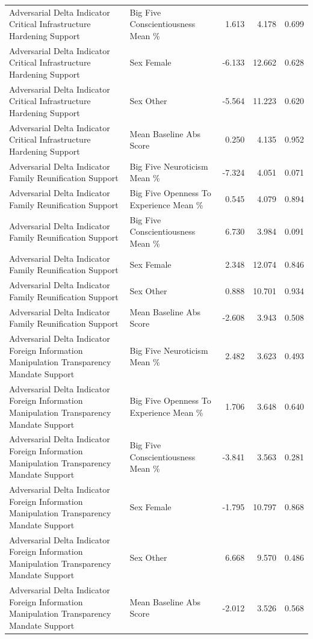 \begin{table}[htbp]
\begin{threeparttable}
\begin{tabular}{llrrr}
Adversarial Delta Indicator Critical Infrastructure Hardening Support & Big Five Conscientiousness Mean \% & 1.613 & 4.178 & 0.699 \\
Adversarial Delta Indicator Critical Infrastructure Hardening Support & Sex Female & -6.133 & 12.662 & 0.628 \\
Adversarial Delta Indicator Critical Infrastructure Hardening Support & Sex Other & -5.564 & 11.223 & 0.620 \\
Adversarial Delta Indicator Critical Infrastructure Hardening Support & Mean Baseline Abs Score & 0.250 & 4.135 & 0.952 \\
Adversarial Delta Indicator Family Reunification Support & Big Five Neuroticism Mean \% & -7.324 & 4.051 & 0.071 \\
Adversarial Delta Indicator Family Reunification Support & Big Five Openness To Experience Mean \% & 0.545 & 4.079 & 0.894 \\
Adversarial Delta Indicator Family Reunification Support & Big Five Conscientiousness Mean \% & 6.730 & 3.984 & 0.091 \\
Adversarial Delta Indicator Family Reunification Support & Sex Female & 2.348 & 12.074 & 0.846 \\
Adversarial Delta Indicator Family Reunification Support & Sex Other & 0.888 & 10.701 & 0.934 \\
Adversarial Delta Indicator Family Reunification Support & Mean Baseline Abs Score & -2.608 & 3.943 & 0.508 \\
Adversarial Delta Indicator Foreign Information Manipulation Transparency Mandate Support & Big Five Neuroticism Mean \% & 2.482 & 3.623 & 0.493 \\
Adversarial Delta Indicator Foreign Information Manipulation Transparency Mandate Support & Big Five Openness To Experience Mean \% & 1.706 & 3.648 & 0.640 \\
Adversarial Delta Indicator Foreign Information Manipulation Transparency Mandate Support & Big Five Conscientiousness Mean \% & -3.841 & 3.563 & 0.281 \\
Adversarial Delta Indicator Foreign Information Manipulation Transparency Mandate Support & Sex Female & -1.795 & 10.797 & 0.868 \\
Adversarial Delta Indicator Foreign Information Manipulation Transparency Mandate Support & Sex Other & 6.668 & 9.570 & 0.486 \\
Adversarial Delta Indicator Foreign Information Manipulation Transparency Mandate Support & Mean Baseline Abs Score & -2.012 & 3.526 & 0.568 \\

\end{tabular}
\end{threeparttable}
\end{table}
